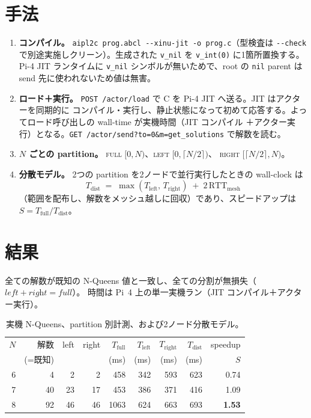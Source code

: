 \documentclass[11pt]{ltjsarticle}
\begin{document}
\section{手法}
\begin{enumerate}
  \item \textbf{コンパイル。} \texttt{aipl2c prog.abcl -{}-xinu-jit -o prog.c}（型検査は \texttt{-{}-check}
  で別途実施しクリーン）。生成された \texttt{v\_nil} を \texttt{v\_int(0)} に1箇所置換する。Pi-4 JIT ランタイムに
  \texttt{v\_nil} シンボルが無いためで、root の \texttt{nil} parent は send 先に使われないため値は無害。
  \item \textbf{ロード＋実行。} \texttt{POST /actor/load} で C を Pi-4 JIT へ送る。JIT はアクターを同期的に
  コンパイル・実行し、静止状態になって初めて応答する。よってロード呼び出しの wall-time が実機時間（JIT コンパイル
  ＋アクター実行）となる。\texttt{GET /actor/send?to=0\&m=get\_solutions} で解数を読む。
  \item \textbf{$N$ ごとの partition。} \textsc{full} $[0,N)$、\textsc{left} $[0,\lceil N/2\rceil)$、
  \textsc{right} $[\lceil N/2\rceil,N)$。
  \item \textbf{分散モデル。} 2つの partition を2ノードで並行実行したときの wall-clock は
  \[
    T_\mathrm{dist} \;=\; \max(T_\mathrm{left},\,T_\mathrm{right}) \;+\; 2\,\mathrm{RTT_{mesh}}
  \]
  （範囲を配布し、解数をメッシュ越しに回収）であり、スピードアップは $S = T_\mathrm{full}/T_\mathrm{dist}$。
\end{enumerate}

\section{結果}
全ての解数が既知の N-Queens 値と一致し、全ての分割が無損失（$\textit{left}+\textit{right}=\textit{full}$）。
時間は Pi~4 上の単一実機ラン（JIT コンパイル＋アクター実行）。

\begin{table}[h]\centering
\caption{実機 N-Queens、partition 別計測、および2ノード分散モデル。}
\label{tab:res}
\begin{tabular}{rrrr rrr rr}
\toprule
$N$ & 解数 & left & right & $T_\mathrm{full}$ & $T_\mathrm{left}$ & $T_\mathrm{right}$ & $T_\mathrm{dist}$ & speedup\\
 & (=既知) & & & (ms) & (ms) & (ms) & (ms) & $S$\\
\midrule
6 & 4  & 2  & 2  & 458  & 342 & 593 & 623 & 0.74\\
7 & 40 & 23 & 17 & 453  & 386 & 371 & 416 & 1.09\\
8 & 92 & 46 & 46 & 1063 & 624 & 663 & 693 & \textbf{1.53}\\
\bottomrule
\end{tabular}
\end{table}
\end{document}
